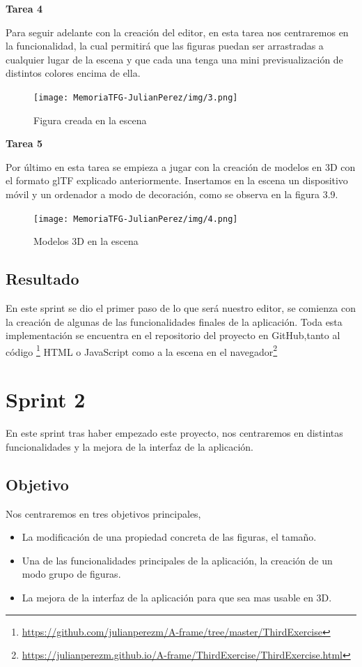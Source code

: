 \documentclass[a4paper, 12pt]{book}
\begin{document}
\textbf{Tarea 4}

Para seguir adelante con la creación del editor, en esta tarea nos centraremos en la funcionalidad, la cual permitirá que las figuras puedan ser arrastradas a cualquier lugar de la escena y que cada una tenga una mini previsualización de distintos colores encima de ella.          
\begin{figure}[H]
  \centering
  \texttt{[image: MemoriaTFG-JulianPerez/img/3.png]}
  \caption{Figura creada en la escena}\label{scrum}
\end{figure}

\textbf{Tarea 5}

Por último en esta tarea se empieza a jugar con la creación de modelos en 3D con el formato glTF explicado anteriormente. Insertamos en la escena un dispositivo móvil y un ordenador a modo de decoración, como se observa en la figura 3.9.
\begin{figure}[H]
  \centering
  \texttt{[image: MemoriaTFG-JulianPerez/img/4.png]}
  \caption{Modelos 3D en la escena}\label{scrum}
\end{figure}

\subsection{Resultado}
En este sprint se dio el primer paso de lo que será nuestro editor, se comienza con la creación de algunas de las funcionalidades finales de la aplicación. Toda esta implementación se encuentra en el repositorio del proyecto en GitHub,tanto al código \footnote{\url{https://github.com/julianperezm/A-frame/tree/master/ThirdExercise}} HTML o JavaScript como a la escena en el navegador\footnote{\url{https://julianperezm.github.io/A-frame/ThirdExercise/ThirdExercise.html}}

\section{Sprint 2}
En este sprint tras haber empezado este proyecto, nos centraremos en distintas funcionalidades y la mejora de la interfaz de la aplicación.

\subsection{Objetivo}
Nos centraremos en tres objetivos principales, 

\begin{itemize}
    \item La modificación de una propiedad concreta de las figuras, el tamaño.
    \item Una de las funcionalidades principales de la aplicación, la creación de un modo grupo de figuras.
    \item La mejora de la interfaz de la aplicación para que sea mas usable en 3D.
\end{itemize}
\end{document}
